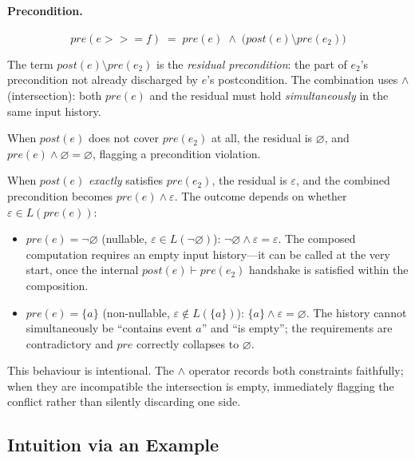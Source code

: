\documentclass[acmsmall,screen]{acmart}
\newcommand{\pre}{\mathit{pre}}
\newcommand{\post}{\mathit{post}}
\newcommand{\univ}{\neg\varnothing}
\begin{document}
\paragraph{Precondition.}

\begin{equation}
  \pre(e \mathbin{>\!\!>\!\!=} f)
  \;=\;
  \pre(e) \;\wedge\; \bigl(\post(e) \setminus \pre(e_2)\bigr)
  \label{eq:pre-bind}
\end{equation}

The term $\post(e) \setminus \pre(e_2)$ is the \emph{residual
precondition}: the part of $e_2$'s precondition not already discharged
by $e$'s postcondition.
The combination uses $\wedge$ (intersection): both $\pre(e)$ and the
residual must hold \emph{simultaneously} in the same input history.

When $\post(e)$ does not cover $\pre(e_2)$ at all, the residual is
$\varnothing$, and $\pre(e) \wedge \varnothing = \varnothing$,
flagging a precondition violation.

When $\post(e)$ \emph{exactly} satisfies $\pre(e_2)$, the residual is
$\varepsilon$, and the combined precondition becomes
$\pre(e) \wedge \varepsilon$.
The outcome depends on whether $\varepsilon \in L(\pre(e))$:
\begin{itemize}
  \item $\pre(e) = \univ$ (nullable, $\varepsilon \in L(\univ)$):
        $\univ \wedge \varepsilon = \varepsilon$.
        The composed computation requires an empty input history---it
        can be called at the very start, once the internal
        $\post(e) \vdash \pre(e_2)$ handshake is satisfied within the
        composition.
  \item $\pre(e) = \{a\}$ (non-nullable, $\varepsilon \notin L(\{a\})$):
        $\{a\} \wedge \varepsilon = \varnothing$.
        The history cannot simultaneously be ``contains event $a$''
        and ``is empty''; the requirements are contradictory and
        $\pre$ correctly collapses to $\varnothing$.
\end{itemize}

This behaviour is intentional.
The $\wedge$ operator records both constraints faithfully; when they
are incompatible the intersection is empty, immediately flagging the
conflict rather than silently discarding one side.

\subsection{Intuition via an Example}
\end{document}
